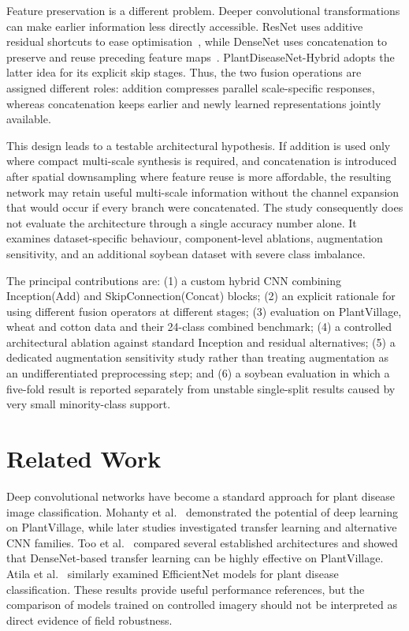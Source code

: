 \documentclass[a4paper,fleqn]{cas-dc}
\begin{document}
Feature preservation is a different problem. Deeper convolutional transformations can make earlier information less directly accessible. ResNet uses additive residual shortcuts to ease optimisation~\citep{he2016}, while DenseNet uses concatenation to preserve and reuse preceding feature maps~\citep{huang2017}. PlantDiseaseNet-Hybrid adopts the latter idea for its explicit skip stages. Thus, the two fusion operations are assigned different roles: addition compresses parallel scale-specific responses, whereas concatenation keeps earlier and newly learned representations jointly available.

This design leads to a testable architectural hypothesis. If addition is used only where compact multi-scale synthesis is required, and concatenation is introduced after spatial downsampling where feature reuse is more affordable, the resulting network may retain useful multi-scale information without the channel expansion that would occur if every branch were concatenated. The study consequently does not evaluate the architecture through a single accuracy number alone. It examines dataset-specific behaviour, component-level ablations, augmentation sensitivity, and an additional soybean dataset with severe class imbalance.

The principal contributions are: (1) a custom hybrid CNN combining Inception(Add) and SkipConnection(Concat) blocks; (2) an explicit rationale for using different fusion operators at different stages; (3) evaluation on PlantVillage, wheat and cotton data and their 24-class combined benchmark; (4) a controlled architectural ablation against standard Inception and residual alternatives; (5) a dedicated augmentation sensitivity study rather than treating augmentation as an undifferentiated preprocessing step; and (6) a soybean evaluation in which a five-fold result is reported separately from unstable single-split results caused by very small minority-class support.

\section{Related Work}
Deep convolutional networks have become a standard approach for plant disease image classification. Mohanty et al.~\citep{mohanty2016} demonstrated the potential of deep learning on PlantVillage, while later studies investigated transfer learning and alternative CNN families. Too et al.~\citep{too2019} compared several established architectures and showed that DenseNet-based transfer learning can be highly effective on PlantVillage. Atila et al.~\citep{atila2021} similarly examined EfficientNet models for plant disease classification. These results provide useful performance references, but the comparison of models trained on controlled imagery should not be interpreted as direct evidence of field robustness.
\end{document}
